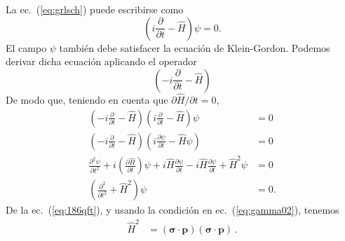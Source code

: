 La ec.~(\ref{eq:grlsch}) puede escribirse como
\begin{equation}
  \left(i\frac{\partial}{\partial t}-\hat{H}\right)\psi=0.
\end{equation}
El campo $\psi$ también debe satisfacer la ecuación de Klein-Gordon. Podemos derivar dicha ecuación aplicando el operador
\begin{equation*}
  \left(-i\frac{\partial}{\partial t}-\hat{H}\right)
\end{equation*}
De modo que, teniendo en cuenta que $\partial\hat H/\partial t=0$,
\begin{align}
  \label{eq:105qft}
 \left(-i\frac{\partial}{\partial t}-\hat{H}\right)\left(i\frac{\partial}{\partial t}-\hat{H}\right)\psi&=0\nonumber\\
 \left(-i\frac{\partial}{\partial t}-\hat{H}\right)\left(i\frac{\partial\psi}{\partial t}-\hat{H}\psi\right)&=0\nonumber\\
 \frac{\partial^2\psi}{\partial t^2}+i\left(\frac{\partial\hat{H}}{\partial t}\right)\psi
 +i\hat{H}\frac{\partial\psi}{\partial t}-i\hat{H}\frac{\partial\psi}{\partial t}+\hat{H}^2\psi&=0\nonumber\\
 \left(\frac{\partial^2}{\partial t^2}+\hat{H}^2\right)\psi&=0.
\end{align}
% 
De la ec.~(\ref{eq:186qft}), y usando la condición en ec.~(\ref{eq:gamma02}), tenemos
\begin{align}
\label{eq:106qft}
\hat{H}^2&=(\boldsymbol\sigma\cdot\mathbf{p})(\boldsymbol\sigma\cdot\mathbf{p})\,.
\end{align}

